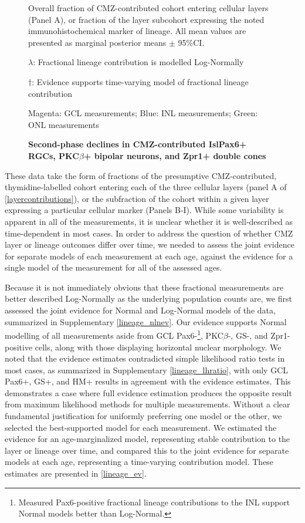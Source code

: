 \begin{figure}[!h]
    \caption{{\bf Second-phase declines in CMZ-contributed Isl\/Pax6+ RGCs, PKC$\beta$+ bipolar neurons, and Zpr1+ double cones}}
    Overall fraction of CMZ-contributed cohort entering cellular layers (Panel A), or fraction of the layer subcohort expressing the noted immunohistochemical marker of lineage. All mean values are presented as marginal posterior means $\pm$ 95\%CI.

    $\lambda$: Fractional lineage contribution is modelled Log-Normally

    $\dagger$: Evidence supports time-varying model of fractional lineage contribution

    Magenta: GCL measurements; Blue: INL measurements; Green: ONL measurements
    \label{layercontributions}
\end{figure}

These data take the form of fractions of the presumptive CMZ-contributed, thymidine-labelled cohort entering each of the three cellular layers (panel A of \autoref{layercontributions}), or the subfraction of the cohort within a given layer expressing a particular cellular marker (Panels B-I). While some variability is apparent in all of the measurements, it is unclear whether it is well-described as time-dependent in most cases. In order to address the question of whether CMZ layer or lineage outcomes differ over time, we needed to assess the joint evidence for separate models of each measurement at each age, against the evidence for a single model of the measurement for all of the assessed ages. 

Because it is not immediately obvious that these fractional measurements are better described Log-Normally as the underlying population counts are, we first assessed the joint evidence for Normal and Log-Normal models of the data, summarized in Supplementary \autoref{lineage_nlnev}. Our evidence supports Normal modelling of all measurements aside from GCL Pax6-\footnote{Measured Pax6-positive fractional lineage contributions to the INL support Normal models better than Log-Normal.}, PKC$\beta$-, GS-, and Zpr1-positive cells, along with those displaying horizontal nuclear morphology. We noted that the evidence estimates contradicted simple likelihood ratio tests in most cases, as summarized in Supplementary \autoref{lineage_lhratio}, with only GCL Pax6+, GS+, and HM+ results in agreement with the evidence estimates. This demonstrates a case where full evidence estimation produces the opposite result from maximum likelihood methods for multiple measurements.  Without a clear fundamental justification for uniformly preferring one model or the other, we selected the best-supported model for each measurement. We estimated the evidence for an age-marginalized model, representing stable contribution to the layer or lineage over time, and compared this to the joint evidence for separate models at each age, representing a time-varying contribution model. These estimates are presented in \autoref{lineage_ev}.

